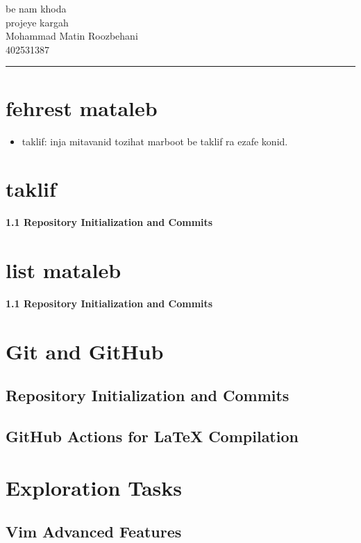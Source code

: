 \documentclass{article}
\begin{document}
\usepackage{graphicx}
\begin{center}
    {\Huge be nam khoda} \\[1cm]
    {\LARGE projeye kargah} \\[0.5cm]
    {\large Mohammad Matin Roozbehani} \\[0.5cm]
    {\large 402531387} \\[1cm]
    \rule{\linewidth}{0.4mm}
\end{center}

\vspace{1cm}

\section*{fehrest mataleb}
\begin{itemize}
    \item taklif: inja mitavanid tozihat marboot be taklif ra ezafe konid.
\end{itemize}

\newpage

\section*{taklif}
\textbf{1.1 Repository Initialization and Commits}

\section*{list mataleb}
\textbf{1.1 Repository Initialization and Commits}

\section{Git and GitHub}
\subsection{Repository Initialization and Commits}
\subsection{GitHub Actions for LaTeX Compilation}

\section{Exploration Tasks}
\subsection{Vim Advanced Features}
\end{document}
